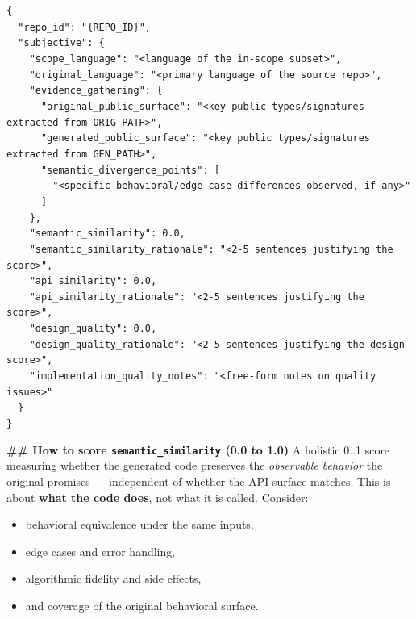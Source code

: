 \begin{promptbox}
\texttt{\{}\\
\texttt{~~"repo\_id": "\{REPO\_ID\}",}\\
\texttt{~~"subjective": \{}\\
\texttt{~~~~"scope\_language":              "<language of the in-scope subset>",}\\
\texttt{~~~~"original\_language":           "<primary language of the source repo>",}\\
\texttt{~~~~"evidence\_gathering": \{}\\
\texttt{~~~~~~"original\_public\_surface":   "<key public types/signatures extracted from ORIG\_PATH>",}\\
\texttt{~~~~~~"generated\_public\_surface":  "<key public types/signatures extracted from GEN\_PATH>",}\\
\texttt{~~~~~~"semantic\_divergence\_points": [}\\
\texttt{~~~~~~~~"<specific behavioral/edge-case differences observed, if any>"}\\
\texttt{~~~~~~]}\\
\texttt{~~~~\},}\\
\texttt{~~~~"semantic\_similarity":         0.0,}\\
\texttt{~~~~"semantic\_similarity\_rationale": "<2-5 sentences justifying the score>",}\\
\texttt{~~~~"api\_similarity":              0.0,}\\
\texttt{~~~~"api\_similarity\_rationale":    "<2-5 sentences justifying the score>",}\\
\texttt{~~~~"design\_quality":              0.0,}\\
\texttt{~~~~"design\_quality\_rationale":    "<2-5 sentences justifying the design score>",}\\
\texttt{~~~~"implementation\_quality\_notes": "<free-form notes on quality issues>"}\\
\texttt{~~\}}\\
\texttt{\}}

\textbf{\#\# How to score \texttt{semantic\_similarity} (0.0 to 1.0)}
A holistic 0..1 score measuring whether the generated code preserves the \emph{observable behavior} the original promises --- independent of whether the API surface matches. This is about \textbf{what the code does}, not what it is called. Consider:
\begin{itemize}
\item behavioral equivalence under the same inputs,
\item edge cases and error handling,
\item algorithmic fidelity and side effects,
\item and coverage of the original behavioral surface.
\end{itemize}


\end{promptbox}
